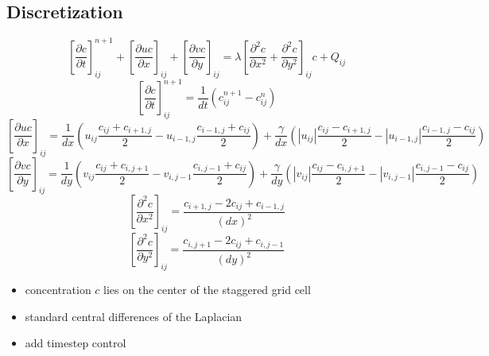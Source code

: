 \documentclass{article}
\begin{document}
\subsection{Discretization}
\begin{equation}
\left \lbrack \frac{\partial c}{\partial t} \right \rbrack_{ij}^{n+1} + \left
\lbrack \frac{\partial uc}{\partial x} \right \rbrack_{ij} + \left \lbrack
\frac{\partial vc}{\partial y} \right \rbrack_{ij} = \lambda \left \lbrack
\frac{\partial^2 c}{\partial x^2} + \frac{\partial^2 c}{\partial y^2} \right \rbrack_{ij} c + Q_{ij}
\end{equation}
\begin{equation}
\left \lbrack \frac{\partial c}{\partial t} \right \rbrack_{ij}^{n+1} =
\frac{1}{dt} \left (c_{ij}^{n+1} - c_{ij}^n \right )
\end{equation}
\begin{equation}
\left \lbrack \frac{\partial uc}{\partial x} \right \rbrack_{ij} =
\frac{1}{dx} \left (u_{ij} \frac{c_{ij}+c_{i+1,j}}{2} - u_{i-1,j}
\frac{c_{i-1,j}+c_{ij}}{2} \right) +
\frac{\gamma}{dx} \left (|u_{ij}| \frac{c_{ij}-c_{i+1,j}}{2} - |u_{i-1,j}|
\frac{c_{i-1,j}-c_{ij}}{2} \right)
\end{equation}
\begin{equation}
\left \lbrack \frac{\partial vc}{\partial y} \right \rbrack_{ij} =
\frac{1}{dy} \left (v_{ij} \frac{c_{ij}+c_{i,j+1}}{2} - v_{i,j-1}
\frac{c_{i,j-1}+c_{ij}}{2} \right) +
\frac{\gamma}{dy} \left (|v_{ij}| \frac{c_{ij}-c_{i,j+1}}{2} - |v_{i,j-1}|
\frac{c_{i,j-1}-c_{ij}}{2} \right)
\end{equation}
\begin{equation}
\left \lbrack \frac{\partial^2 c}{\partial x^2} \right \rbrack_{ij} =
\frac{c_{i+1,j} -2 c_{ij} + c_{i-1,j}}{(dx)^2}
\end{equation}
\begin{equation}
\left \lbrack \frac{\partial^2 c}{\partial y^2} \right \rbrack_{ij} =
\frac{c_{i,j+1} -2 c_{ij} + c_{i,j-1}}{(dy)^2}
\end{equation}

\begin{itemize}
	\item concentration $c$ lies on the center of the staggered grid cell
	\item standard central differences of the Laplacian
	\item add timestep control
\end{itemize}
\end{document}
